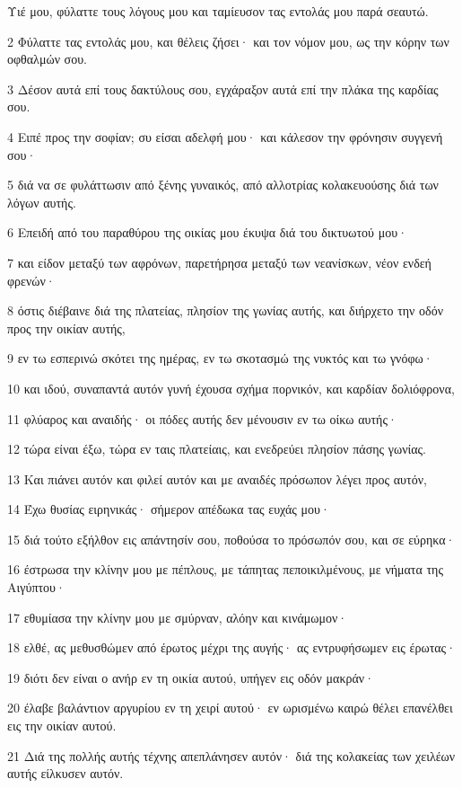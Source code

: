 \par Υιέ μου, φύλαττε τους λόγους μου και ταμίευσον τας εντολάς μου παρά σεαυτώ.
\par 2 Φύλαττε τας εντολάς μου, και θέλεις ζήσει· και τον νόμον μου, ως την κόρην των οφθαλμών σου.
\par 3 Δέσον αυτά επί τους δακτύλους σου, εγχάραξον αυτά επί την πλάκα της καρδίας σου.
\par 4 Ειπέ προς την σοφίαν; συ είσαι αδελφή μου· και κάλεσον την φρόνησιν συγγενή σου·
\par 5 διά να σε φυλάττωσιν από ξένης γυναικός, από αλλοτρίας κολακευούσης διά των λόγων αυτής.
\par 6 Επειδή από του παραθύρου της οικίας μου έκυψα διά του δικτυωτού μου·
\par 7 και είδον μεταξύ των αφρόνων, παρετήρησα μεταξύ των νεανίσκων, νέον ενδεή φρενών·
\par 8 όστις διέβαινε διά της πλατείας, πλησίον της γωνίας αυτής, και διήρχετο την οδόν προς την οικίαν αυτής,
\par 9 εν τω εσπερινώ σκότει της ημέρας, εν τω σκοτασμώ της νυκτός και τω γνόφω·
\par 10 και ιδού, συναπαντά αυτόν γυνή έχουσα σχήμα πορνικόν, και καρδίαν δολιόφρονα,
\par 11 φλύαρος και αναιδής· οι πόδες αυτής δεν μένουσιν εν τω οίκω αυτής·
\par 12 τώρα είναι έξω, τώρα εν ταις πλατείαις, και ενεδρεύει πλησίον πάσης γωνίας.
\par 13 Και πιάνει αυτόν και φιλεί αυτόν και με αναιδές πρόσωπον λέγει προς αυτόν,
\par 14 Έχω θυσίας ειρηνικάς· σήμερον απέδωκα τας ευχάς μου·
\par 15 διά τούτο εξήλθον εις απάντησίν σου, ποθούσα το πρόσωπόν σου, και σε εύρηκα·
\par 16 έστρωσα την κλίνην μου με πέπλους, με τάπητας πεποικιλμένους, με νήματα της Αιγύπτου·
\par 17 εθυμίασα την κλίνην μου με σμύρναν, αλόην και κινάμωμον·
\par 18 ελθέ, ας μεθυσθώμεν από έρωτος μέχρι της αυγής· ας εντρυφήσωμεν εις έρωτας·
\par 19 διότι δεν είναι ο ανήρ εν τη οικία αυτού, υπήγεν εις οδόν μακράν·
\par 20 έλαβε βαλάντιον αργυρίου εν τη χειρί αυτού· εν ωρισμένω καιρώ θέλει επανέλθει εις την οικίαν αυτού.
\par 21 Διά της πολλής αυτής τέχνης απεπλάνησεν αυτόν· διά της κολακείας των χειλέων αυτής είλκυσεν αυτόν.
